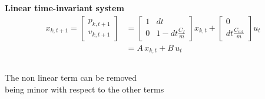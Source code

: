 \documentclass[9pt, aspectratio=169]{beamer}
\begin{document}
\begin{frame}[t]
\begin{columns}
\begin{column}{0.6\textwidth}
 \hspace{2.5cm}\textbf{Linear time-invariant system}
\begin{equation*}
    \begin{aligned}
    	x_{k,t+1} = 
    		\begin{bmatrix}
    			p_{k,t+1} \\
    			v_{k,t+1}
    		\end{bmatrix}
    		& =
    		\begin{bmatrix}
    			1 & dt \\
    			0 & 1-dt\frac{C_f}{m}
    		\end{bmatrix}
    		x_{k,t}
    		+
    		\begin{bmatrix}
    			0 \\
    			dt \frac{C_{m1}}{m}
    		\end{bmatrix}
    		u_t \\
    		& = A \, x_{k,t} + B \, u_t
    \end{aligned}
\end{equation*}
\end{column}
\end{columns}
\begin{columns}
\begin{column}{0.4\textwidth}
\vspace{-0.4cm}
 \begin{block}{}
\centering
{} The non linear term can be removed \\
being minor with respect to the other terms
\end{block}
\end{column}
\begin{column}{0.49\textwidth}
\end{column}
\end{columns}
\end{frame}
\end{document}
